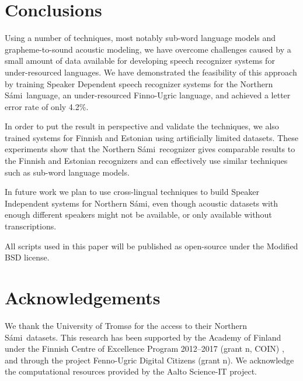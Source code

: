 \documentclass[b5paper]{article}
\newcommand{\note}[1]{{\textcolor{blue}{#1}}}
\newcommand{\ns}{Northern Sámi}
\begin{document}
\section{Conclusions} 
Using a number of techniques, most notably sub-word language models and grapheme-to-sound acoustic modeling, we have overcome challenges caused by a small amount of data available for developing speech recognizer systems for under-resourced languages. We have demonstrated the feasibility of this approach by training Speaker Dependent speech recognizer systems for the \ns\ language, an under-resourced Finno-Ugric language, and achieved a letter error rate of only 4.2\%. 

In order to put the result in perspective and validate the techniques, we also trained systems
 for Finnish and Estonian using artificially limited datasets. These experiments show that the \ns\ recognizer gives comparable results to the Finnish and Estonian recognizers and can effectively use  similar techniques such as sub-word language models.

In future work we plan to use cross-lingual techniques to build Speaker Independent systems for \ns, even though acoustic datasets with enough different speakers might not be available, or only available without transcriptions.

All scripts used in this paper will be published as open-source under the Modified BSD license. 





\section{Acknowledgements} 
We thank the University of Tromsø for the access to their \ns\ datasets.  This research has been supported by the Academy of Finland under the Finnish Centre of Excellence Program 2012--2017 (grant n, COIN) , and through the project Fenno-Ugric Digital Citizens (grant n).
We acknowledge the computational resources provided by the Aalto Science-IT project. 




 
\end{document}
